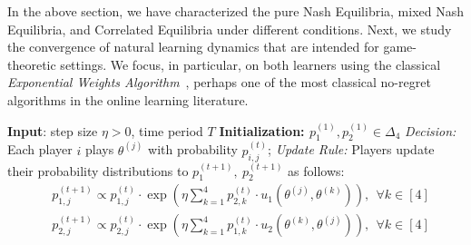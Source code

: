 In the above section, we have characterized the pure Nash Equilibria, mixed Nash Equilibria, and Correlated Equilibria under different conditions. Next, we study the convergence of natural learning dynamics that are intended for game-theoretic settings. We focus, in particular, on both learners using the classical \emph{Exponential Weights Algorithm}~\cite{VOVK1998153,LITTLESTONE1994212}, perhaps one of the most classical no-regret algorithms in the online learning literature. 

\begin{algorithm}[!h]
\caption{Online Learning Dynamic through Exponential Weights %
}
\begin{algorithmic}
\label{alg:Hedge} 
\STATE \textbf{Input}: step size $\eta>0$, time period $T$
    \STATE \textbf{Initialization: $p_1^{(1)},p_2^{(1)}\in\Delta_4$}
\STATE \emph{Decision:} Each player $i$ plays $\theta^{(j)}$ with probability $p_{i,j}^{(t)}$;
\STATE \emph{Update Rule:} Players update their probability distributions to $p_{1}^{(t+1)},~p_{2}^{(t+1)}$ as follows:
\begin{align*}
&p^{(t+1)}_{1,j}\propto p^{(t)}_{1,j} \cdot \exp\left(\eta \sum_{k=1}^4 p^{(t)}_{2,k} \cdot u_1\left(\theta^{(j)},\theta^{(k)}\right)\right),~~\forall k\in[4]\\
&p^{(t+1)}_{2,j}\propto p^{(t)}_{2,j} \cdot \exp\left(\eta \sum_{k=1}^4 p^{(t)}_{1,k} \cdot u_2\left(\theta^{(k)},\theta^{(j)} \right)\right),~~\forall k\in[4]
\end{align*}
\ENDFOR
\end{algorithmic}
\end{algorithm}

